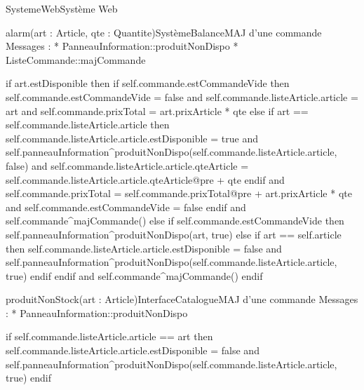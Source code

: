 \begin{OM}{SystemeWeb}{Système Web}
\begin{OMOperation}{alarm(art : Article, qte : Quantite)}{SystèmeBalance}{MAJ d'une commande}
Messages :
* PanneauInformation::{produitNonDispo}
* ListeCommande::{majCommande}
\begin{OMPre}
\end{OMPre}
\begin{OMPost}
        if art.estDisponible then
                if self.commande.estCommandeVide then
                        self.commande.estCommandeVide = false
                        and
                        self.commande.listeArticle.article = art
                        and
                        self.commande.prixTotal = art.prixArticle * qte
                else
                        if art == self.commande.listeArticle.article then
                                self.commande.listeArticle.article.estDisponible = true
                                and
                                self.panneauInformation^produitNonDispo(self.commande.listeArticle.article, false)
                                and
                                self.commande.listeArticle.article.qteArticle =
                                                self.commande.listeArticle.article.qteArticle@pre + qte
                        endif
                        and
                        self.commande.prixTotal = self.commande.prixTotal@pre + art.prixArticle * qte
                        and
                        self.commande.estCommandeVide = false
                endif
                and
                self.commande^majCommande()
        else
                if self.commande.estCommandeVide then
                        self.panneauInformation^produitNonDispo(art, true)
                else
                        if art == self.article then
                                self.commande.listeArticle.article.estDisponible = false
                                and
                                self.panneauInformation^produitNonDispo(self.commande.listeArticle.article, true)
                        endif
                endif
                and
                self.commande^majCommande()
        endif
            \end{OMPost}
\end{OMOperation}

\begin{OMOperation}{produitNonStock(art : Article)}{InterfaceCatalogue}{MAJ d'une commande}
Messages :
* PanneauInformation::{produitNonDispo}
\begin{OMPre}
\end{OMPre}
\begin{OMPost}
        if self.commande.listeArticle.article == art then
                self.commande.listeArticle.article.estDisponible = false
                and
                self.panneauInformation^produitNonDispo(self.commande.listeArticle.article, true)
        endif
            \end{OMPost}
\end{OMOperation}


\end{OM}
